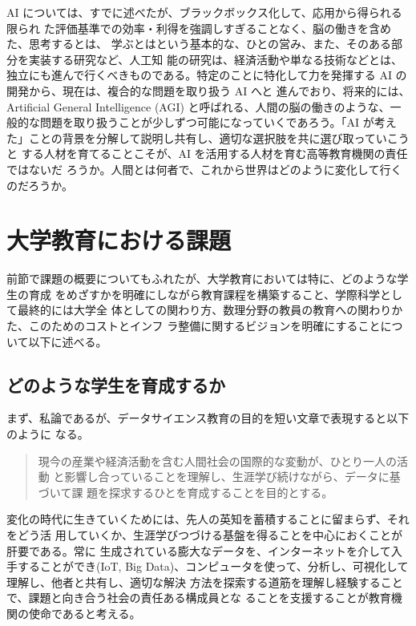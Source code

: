 \documentclass[
]{book}
\theoremstyle{definition}
\theoremstyle{definition}
\theoremstyle{definition}
\theoremstyle{definition}
\theoremstyle{remark}
\begin{document}
AI については、すでに述べたが、ブラックボックス化して、応用から得られる限られ た評価基準での効率・利得を強調しすぎることなく、脳の働きを含めた、思考するとは、 学ぶとはという基本的な、ひとの営み、また、そのある部分を実装する研究など、人工知 能の研究は、経済活動や単なる技術などとは、独立にも進んで行くべきものである。特定のことに特化して力を発揮する AI の開発から、現在は、複合的な問題を取り扱う AI へと 進んでおり、将来的には、Artificial General Intelligence (AGI) と呼ばれる、人間の脳の働きのような、一般的な問題を取り扱うことが少しずつ可能になっていくであろう。「AI が考えた」ことの背景を分解して説明し共有し、適切な選択肢を共に選び取っていこうと する人材を育てることこそが、AI を活用する人材を育む高等教育機関の責任ではないだ ろうか。人間とは何者で、これから世界はどのように変化して行くのだろうか。

\hypertarget{ux5927ux5b66ux6559ux80b2ux306bux304aux3051ux308bux8ab2ux984c}{%
\section{大学教育における課題}\label{ux5927ux5b66ux6559ux80b2ux306bux304aux3051ux308bux8ab2ux984c}}

前節で課題の概要についてもふれたが、大学教育においては特に、どのような学生の育成 をめざすかを明確にしながら教育課程を構築すること、学際科学として最終的には大学全 体としての関わり方、数理分野の教員の教育への関わりかた、このためのコストとインフ ラ整備に関するビジョンを明確にすることについて以下に述べる。

\hypertarget{ux3069ux306eux3088ux3046ux306aux5b66ux751fux3092ux80b2ux6210ux3059ux308bux304b}{%
\subsection{どのような学生を育成するか}\label{ux3069ux306eux3088ux3046ux306aux5b66ux751fux3092ux80b2ux6210ux3059ux308bux304b}}

まず、私論であるが、データサイエンス教育の目的を短い文章で表現すると以下のように
なる。

\begin{quote}
現今の産業や経済活動を含む人間社会の国際的な変動が、ひとり一人の活動 と影響し合っていることを理解し、生涯学び続けながら、データに基づいて課 題を探求するひとを育成することを目的とする。
\end{quote}

変化の時代に生きていくためには、先人の英知を蓄積することに留まらず、それをどう活 用していくか、生涯学びつづける基盤を得ることを中心におくことが肝要である。常に 生成されている膨大なデータを、インターネットを介して入手することができ(IoT, Big Data)、コンピュータを使って、分析し、可視化して理解し、他者と共有し、適切な解決 方法を探索する道筋を理解し経験することで、課題と向き合う社会の責任ある構成員とな ることを支援することが教育機関の使命であると考える。
\end{document}
